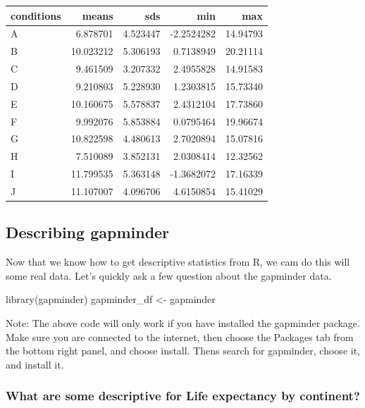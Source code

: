 \documentclass[
]{book}
\newenvironment{Shaded}{\begin{snugshade}}{\end{snugshade}}
\newcommand{\FunctionTok}[1]{\textcolor[rgb]{0.00,0.00,0.00}{#1}}
\newcommand{\NormalTok}[1]{#1}
\newcommand{\OtherTok}[1]{\textcolor[rgb]{0.56,0.35,0.01}{#1}}
\begin{document}
\begin{tabular}{l|r|r|r|r}
\hline
conditions & means & sds & min & max\\
\hline
A & 6.878701 & 4.523447 & -2.2524282 & 14.94793\\
\hline
B & 10.023212 & 5.306193 & 0.7138949 & 20.21114\\
\hline
C & 9.461509 & 3.207332 & 2.4955828 & 14.91583\\
\hline
D & 9.210803 & 5.228930 & 1.2303815 & 15.73340\\
\hline
E & 10.160675 & 5.578837 & 2.4312104 & 17.73860\\
\hline
F & 9.992076 & 5.853884 & 0.0795464 & 19.96674\\
\hline
G & 10.822598 & 4.480613 & 2.7020894 & 15.07816\\
\hline
H & 7.510089 & 3.852131 & 2.0308414 & 12.32562\\
\hline
I & 11.799535 & 5.363148 & -1.3682072 & 17.16339\\
\hline
J & 11.107007 & 4.096706 & 4.6150854 & 15.41029\\
\hline
\end{tabular}

\hypertarget{describing-gapminder}{%
\subsection{Describing gapminder}\label{describing-gapminder}}

Now that we know how to get descriptive statistics from R, we cam do this will some real data. Let's quickly ask a few question about the gapminder data.

\begin{Shaded}
\begin{Highlighting}[]
\FunctionTok{library}\NormalTok{(gapminder)}
\NormalTok{gapminder\_df }\OtherTok{\textless{}{-}}\NormalTok{ gapminder}
\end{Highlighting}
\end{Shaded}

Note: The above code will only work if you have installed the gapminder package. Make sure you are connected to the internet, then choose the Packages tab from the bottom right panel, and choose install. Thens search for gapminder, choose it, and install it.

\hypertarget{what-are-some-descriptive-for-life-expectancy-by-continent}{%
\subsubsection{What are some descriptive for Life expectancy by continent?}\label{what-are-some-descriptive-for-life-expectancy-by-continent}}
\end{document}
